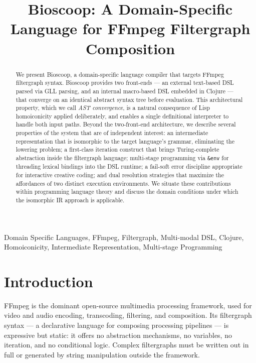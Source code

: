 \documentclass[conference]{IEEEtran}
\begin{document}
\title{Bioscoop: A Domain-Specific Language for FFmpeg Filtergraph Composition}

\author{
}

\maketitle

\begin{abstract}
We present Bioscoop, a domain-specific language compiler that targets FFmpeg filtergraph syntax. Bioscoop provides two front-ends --- an external text-based DSL parsed via GLL parsing, and an internal macro-based DSL embedded in Clojure --- that converge on an identical abstract syntax tree before evaluation. This architectural property, which we call \emph{AST convergence}, is a natural consequence of Lisp homoiconicity applied deliberately, and enables a single definitional interpreter to handle both input paths. Beyond the two-front-end architecture, we describe several properties of the system that are of independent interest: an intermediate representation that is isomorphic to the target language's grammar, eliminating the lowering problem; a first-class iteration construct that brings Turing-complete abstraction inside the filtergraph language; multi-stage programming via \texttt{\&env} for threading lexical bindings into the DSL runtime; a fail-soft error discipline appropriate for interactive creative coding; and dual resolution strategies that maximize the affordances of two distinct execution environments. We situate these contributions within programming language theory and discuss the domain conditions under which the isomorphic IR approach is applicable.
\end{abstract}

\begin{IEEEkeywords}
Domain Specific Languages, FFmpeg, Filtergraph, Multi-modal DSL, Clojure, Homoiconicity, Intermediate Representation, Multi-stage Programming
\end{IEEEkeywords}

\section{Introduction}

FFmpeg is the dominant open-source multimedia processing framework, used for video and audio encoding, transcoding, filtering, and composition. Its filtergraph syntax --- a declarative language for composing processing pipelines --- is expressive but static: it offers no abstraction mechanisms, no variables, no iteration, and no conditional logic. Complex filtergraphs must be written out in full or generated by string manipulation outside the framework.
\end{document}
